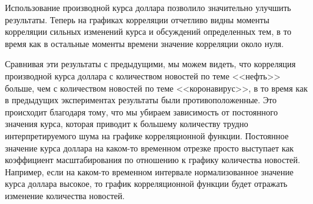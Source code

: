 Использование производной курса доллара позволило значительно улучшить результаты. Теперь на графиках корреляции отчетливо видны моменты корреляции сильных изменений курса и обсуждений определенных тем, в то время как в остальные моменты времени значение корреляции около нуля.

Сравнивая эти результаты с предыдущими, мы можем видеть, что корреляция производной курса доллара с количеством новостей по теме <<нефть>> больше, чем с количеством новостей по теме <<коронавирус>>, в то время как в предыдущих экспериментах результаты были противоположенные. Это происходит благодаря тому, что мы убираем зависимость от постоянного значения курса, которая приводит к большему количеству трудно интерпретируемого шума на графике корреляционной функции. Постоянное значение курса доллара на каком-то временном отрезке просто выступает как коэффициент масштабирования по отношению к графику количества новостей. Например, если на каком-то временном интервале нормализованное значение курса доллара высокое, то график корреляционной функции будет отражать изменение количества новостей.
